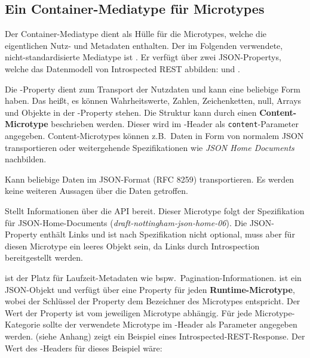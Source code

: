 \subsection{Ein Container-Mediatype für Microtypes}
Der Container-Mediatype dient als Hülle für die Microtypes, welche die eigentlichen Nutz- und Metadaten enthalten. Der im Folgenden verwendete, nicht-standardisierte Mediatype ist . Er verfügt über zwei JSON-Propertys, welche das Datenmodell von Introspected REST abbilden:  und .

Die -Property dient zum Transport der Nutzdaten und kann eine beliebige Form haben. Das heißt, es können Wahrheitswerte, Zahlen, Zeichenketten, null, Arrays und Objekte in der -Property stehen. Die Struktur kann durch einen \textbf{Content-Microtype} beschrieben werden. Dieser wird im -Header als \texttt{content}-Parameter angegeben. Content-Microtypes können z.B.\ Daten in Form von normalem JSON transportieren oder weitergehende Spezifikationen wie \textit{JSON Home Documents} \autocite{Nottingham2017} nachbilden. 

\begin{microtypedef}
    Kann beliebige Daten im JSON-Format (RFC 8259) transportieren. Es werden keine weiteren Aussagen über die Daten getroffen.
\end{microtypedef}

\begin{microtypedef}
    Stellt Informationen über die API bereit. Dieser Microtype folgt der Spezifikation für JSON-Home-Documents (\textit{draft-nottingham-json-home-06}). Die JSON-Property  enthält Links und ist nach Spezifikation nicht optional, muss aber für diesen Microtype ein leeres Objekt sein, da Links durch Introspection bereitgestellt werden.
\end{microtypedef}

\noindent{} ist der Platz für Laufzeit-Metadaten wie bspw.\ Pagination-Informationen.  ist ein JSON-Objekt und verfügt über eine Property für jeden \textbf{Runtime-Microtype}, wobei der Schlüssel der Property dem Bezeichner des Microtypes entspricht. Der Wert der Property ist vom jeweiligen Microtype abhängig. Für jede Microtype-Kategorie sollte der verwendete Microtype im -Header als Parameter angegeben werden.  (siehe Anhang) zeigt ein Beispiel eines Introspected-REST-Response. Der Wert des -Headers für dieses Beispiel wäre:

